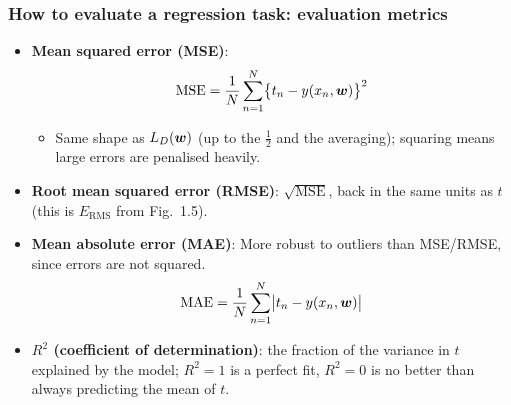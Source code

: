 \documentclass[10pt]{beamer}
\begin{document}
\begin{frame}[fragile]
\frametitle{How to evaluate a regression task: evaluation metrics}

\small
\begin{itemize}
\item \textbf{Mean squared error (MSE)}:
\[
\mathrm{MSE} = \frac{1}{N}\sum_{n=1}^N \bigl\{t_n - y(x_n,\boldsymbol{w})\bigr\}^2
\]
  \begin{itemize}
  \item Same shape as $L_D(\boldsymbol{w})$ (up to the $\frac12$ and the
    averaging); squaring means large errors are penalised heavily.
  \end{itemize}
\item \textbf{Root mean squared error (RMSE)}: $\sqrt{\mathrm{MSE}}$,
  back in the same units as $t$ (this is $E_{\mathrm{RMS}}$ from
  Fig.\ 1.5).
\item \textbf{Mean absolute error (MAE)}:  More robust to outliers than MSE/RMSE, since errors are not
    squared.
\[
\mathrm{MAE} = \frac{1}{N}\sum_{n=1}^N \bigl|t_n - y(x_n,\boldsymbol{w})\bigr|
\]
\item \textbf{$R^2$ (coefficient of determination)}: the fraction of
  the variance in $t$ explained by the model; $R^2{=}1$ is a perfect
  fit, $R^2{=}0$ is no better than always predicting the mean of $t$.
\end{itemize}


\end{frame}
\end{document}
